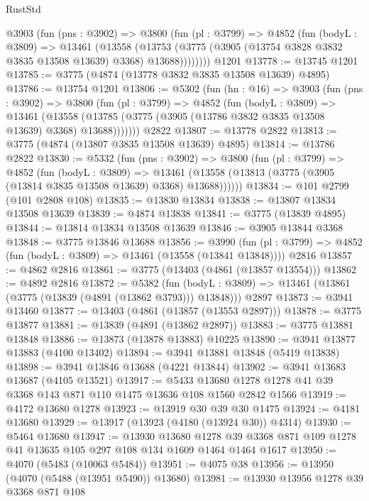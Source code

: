 \begin{lexlean}{RustStd}
\begin{coremodule}
{\begin{coremodule}
{{{{{{{{{{{{{{{{{{{{{{{{{{{{{{{      @3903
        (fun (pns : @3902) =>
        @3800
          (fun (pl : @3799) =>
          @4852
            (fun (bodyL : @3809) =>
            @13461
              (@13558
                (@13753 (@3775 (@3905 (@13754 @3828 @3832 @3835 @13508 @13639) @3368) @13688))))))))
    @1201
@13778 := @13745 @1201
@13785 := @3775 (@4874 (@13778 @3832 @3835 @13508 @13639) @4895)
@13786 := @13754 @1201
@13806 := @5302
    (fun (hn : @16) =>
    @3903
      (fun (pns : @3902) =>
      @3800
        (fun (pl : @3799) =>
        @4852
          (fun (bodyL : @3809) =>
          @13461
            (@13558 (@13785 (@3775 (@3905 (@13786 @3832 @3835 @13508 @13639) @3368) @13688)))))))
    @2822
@13807 := @13778 @2822
@13813 := @3775 (@4874 (@13807 @3835 @13508 @13639) @4895)
@13814 := @13786 @2822
@13830 := @5332
    (fun (pns : @3902) =>
    @3800
      (fun (pl : @3799) =>
      @4852
        (fun (bodyL : @3809) =>
        @13461 (@13558 (@13813 (@3775 (@3905 (@13814 @3835 @13508 @13639) @3368) @13688))))))
@13834 := @101 @2799 (@101 @2808 @108)
@13835 := @13830 @13834
@13838 := @13807 @13834 @13508 @13639
@13839 := @4874 @13838
@13841 := @3775 (@13839 @4895)
@13844 := @13814 @13834 @13508 @13639
@13846 := @3905 @13844 @3368
@13848 := @3775 @13846 @13688
@13856 := @3990
    (fun (pl : @3799) => @4852 (fun (bodyL : @3809) => @13461 (@13558 (@13841 @13848))))
    @2816
@13857 := @4862 @2816
@13861 := @3775 (@13403 (@4861 (@13857 @13554)))
@13862 := @4892 @2816
@13872 := @5382
    (fun (bodyL : @3809) => @13461 (@13861 (@3775 (@13839 (@4891 (@13862 @3793))) @13848)))
    @2897
@13873 := @3941 @13460
@13877 := @13403 (@4861 (@13857 (@13553 @2897)))
@13878 := @3775 @13877
@13881 := @13839 (@4891 (@13862 @2897))
@13883 := @3775 @13881 @13848
@13886 := @13873 (@13878 @13883) @10225
@13890 := @3941 @13877 @13883 (@4100 @13402)
@13894 := @3941 @13881 @13848 (@5419 @13838)
@13898 := @3941 @13846 @13688 (@4221 @13844)
@13902 := @3941 @13683 @13687 (@4105 @13521)
@13917 := @5433 @13680 @1278 @1278 @41 @39 @3368 @143 @871 @110 @1475 @13636 @108 @1560 @2842 @1566
@13919 := @4172 @13680 @1278
@13923 := @13919 @30 @39 @30 @1475
@13924 := @4181 @13680
@13929 := @13917 (@13923 (@4180 (@13924 @30)) @4314)
@13930 := @5464 @13680
@13947 := @13930
    @13680
    @1278
    @39
    @3368
    @871
    @109
    @1278
    @41
    @13635
    @105
    @297
    @108
    @134
    @1609
    @1464
    @1464
    @1617
@13950 := @4070 (@5483 (@10063 @5484))
@13951 := @4075 @38
@13956 := @13950 (@4070 (@5488 (@13951 @5490)) @13680)
@13981 := @13930
    @13956
    @1278
    @39
    @3368
    @871
    @108
}}}}}}}}}}}}}}}}}}}}}}}}}}}}}}}
\end{coremodule}}
\end{coremodule}
\end{lexlean}
